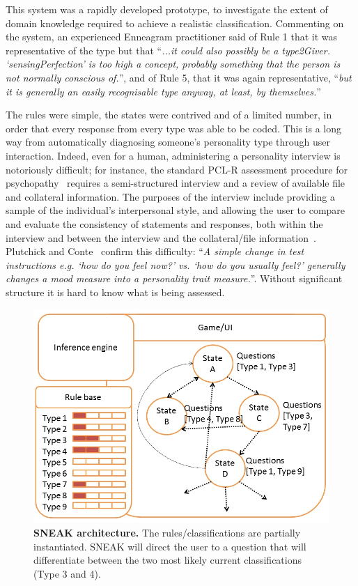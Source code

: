 \documentclass{llncs}
\begin{document}
This system was a rapidly developed prototype, to investigate the
extent of domain knowledge required to achieve a realistic
classification. Commenting on the system, an experienced Enneagram
practitioner said of Rule 1 that it was representative of the type but
that ``{\emph{...it could also possibly be a type2Giver. `sensingPerfection' is
too high a concept, probably something that the person is not normally
conscious of.}}'', and of Rule 5, that it was again representative,
``{\emph{but it is generally an easily recognisable type anyway, at least, by
themselves.}}''

The rules were simple, the states were contrived and of a
limited number, in order that every response from every type was able
to be coded. This is a long way from automatically diagnosing
someone's personality type through user interaction. Indeed, even for a
human, administering a personality interview is notoriously
difficult; for instance, the standard PCL-R assessment
procedure for psychopathy~\cite{hare:2003} requires a semi-structured interview and a
review of available file and collateral information. The purposes of
the interview include providing a sample of the individual's
interpersonal style, and allowing the user to compare and evaluate the
consistency of statements and responses, both within the interview and
between the interview and the collateral/file
information~\cite{hare:2003}.  Plutchick and
Conte~\cite{plutchick+conte:1989} confirm this difficulty: ``{\emph{A simple change in
test instructions e.g. `how do you feel now?' vs. `how do you usually
feel?' generally changes a mood measure into a personality trait
measure.}}''. Without significant structure it is hard to know what is being
assessed.

\begin{figure}[!ht]
\centering
\includegraphics[width=0.8\columnwidth]{images/SNEAKarchitecture.jpg}
\caption{{\textbf{SNEAK architecture.}} The rules/classifications are partially instantiated. SNEAK will direct the user to a question that will differentiate between the two most likely current classifications (Type 3 and 4). }
\label{fig:sneakarch} 
\end{figure}
\end{document}
